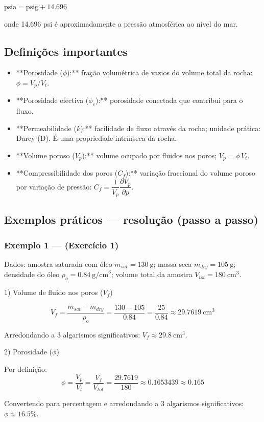 \documentclass[11pt,a4paper]{article}
\begin{document}
$\text{psia} = \text{psig} + 14.696$

onde 14.696 psi é aproximadamente a pressão atmosférica ao nível do mar.

\subsection{Definições importantes}
\begin{itemize}
\item **Porosidade ($\phi$):** fração volumétrica de vazios do volume total da rocha: $\phi = V_p / V_t$.
\item **Porosidade efectiva ($\phi_e$):** porosidade conectada que contribui para o fluxo.
\item **Permeabilidade ($k$):** facilidade de fluxo através da rocha; unidade prática: Darcy (D). É uma propriedade intrínseca da rocha.
\item **Volume poroso ($V_p$):** volume ocupado por fluidos nos poros; $V_p=\phi\,V_t$.
\item **Compressibilidade dos poros ($C_f$):** variação fraccional do volume poroso por variação de pressão: $C_f=\dfrac{1}{V_p}\dfrac{\partial V_p}{\partial p}$.
\end{itemize}

\subsection{Exemplos práticos — resolução (passo a passo)}

\subsubsection{Exemplo 1 — (Exercício 1)}
Dados: amostra saturada com óleo $m_{sat}=130\ \text{g}$; massa seca $m_{dry}=105\ \text{g}$; densidade do óleo $\rho_o=0.84\ \text{g/cm}^3$; volume total da amostra $V_{tot}=180\ \text{cm}^3$.

1) Volume de fluido nos poros ($V_f$)

\[
V_f = \frac{m_{sat}-m_{dry}}{\rho_o} = \frac{130-105}{0.84} = \frac{25}{0.84} \approx 29.7619\ \text{cm}^3
\]

Arredondando a 3 algarismos significativos: $V_f \approx 29.8\ \text{cm}^3$.

2) Porosidade ($\phi$)

Por definição:
\[
\phi = \frac{V_p}{V_t} = \frac{V_f}{V_{tot}} = \frac{29.7619}{180} \approx 0.1653439 \approx 0.165
\]

Convertendo para percentagem e arredondando a 3 algarismos significativos: $\phi \approx 16.5\%$.
\end{document}
